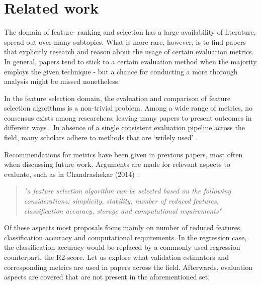 \documentclass[../main.tex]{subfiles}
\begin{document}
\section{Related work}\label{section:related-work}
The domain of feature- ranking and selection has a large availability of literature, spread out over many subtopics. What is more rare, however, is to find papers that explicitly research and reason about the usage of certain evaluation metrics. In general, papers tend to stick to a certain evaluation method when the majority employs the given technique - but a chance for conducting a more thorough analysis might be missed nonetheless.

In the feature selection domain, the evaluation and comparison of feature selection algorithms is a non-trivial problem. Among a wide range of metrics, no consensus exists among researchers, leaving many papers to present outcomes in different ways \citep{guyon_introduction_2003}. In absence of a single consistent evaluation pipeline across the field, many scholars adhere to methods that are `widely used' \citep{solorio-fernandez_review_2020} \citep{li_feature_2017}.

Recommendations for metrics have been given in previous papers, most often when discussing future work. Arguments are made for relevant aspects to evaluate, such as in Chandrashekar (2014) \citep{chandrashekar_survey_2014}:

\begin{quote}\textit{"a feature selection algorithm can be selected based on the following considerations: simplicity, stability, number of reduced features, classification accuracy, storage and computational requirements"}\end{quote}

Of these aspects most proposals focus mainly on number of reduced features, classification accuracy and computational requirements. In the regression case, the classification accuracy would be replaced by a commonly used regression counterpart, the R2-score. Let us explore what validation estimators and corresponding metrics are used in papers across the field. Afterwards, evaluation aspects are covered that are not present in the aforementioned set.
\end{document}
